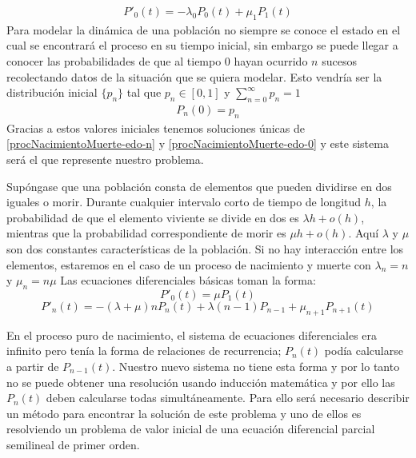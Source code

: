 \begin{eqnarray}
    P'_0(t)=-\lambda_0 P_0(t)+\mu_{1}P_{1}(t)
\label{procNacimientoMuerte-edo-0}
\end{eqnarray}
Para modelar la dinámica de una población no siempre se conoce el estado en el cual se encontrará el proceso en su tiempo inicial, sin embargo se puede llegar a conocer las probabilidades de que al tiempo $0$ hayan ocurrido $n$ sucesos recolectando datos de la situación que se quiera modelar. Esto vendría ser la distribución inicial $\{p_n\}$ tal que $p_n\in [0,1]$ y $\sum_{n=0}^\infty p_n =1$
\begin{eqnarray}
    P_n(0)=p_n
\end{eqnarray}
Gracias a estos valores iniciales tenemos soluciones únicas de \ref{procNacimientoMuerte-edo-n} y \ref{procNacimientoMuerte-edo-0} y este sistema será el que represente nuestro problema.\\
\begin{Ejm}
Supóngase que una población consta de elementos que pueden dividirse en dos iguales o morir. Durante cualquier intervalo corto de tiempo de longitud $h$, la probabilidad de que el elemento viviente se divide en dos es $\lambda h+ o(h)$, mientras que la probabilidad correspondiente de morir es $\mu h + o(h)$. Aquí $\lambda$ y $\mu$ son dos constantes características de la población. Si no hay interacción entre los elementos, estaremos en el caso de un proceso de nacimiento y muerte con $\lambda_n=n$ y $\mu_n =n \mu$
Las ecuaciones diferenciales básicas toman la forma:
$$P'_0(t)=\mu P_1(t)$$
$$P'_n(t)=-(\lambda+\mu)n P_n(t)+\lambda(n-1)P_{n-1}+\mu_{n+1}P_{n+1}(t)$$
\end{Ejm}
En el proceso puro de nacimiento, el sistema de ecuaciones diferenciales era infinito pero tenía la forma de relaciones de recurrencia; $P_n(t)$ podía calcularse a partir de $P_{n-1}(t)$. Nuestro nuevo sistema no tiene esta forma y por lo tanto no se puede obtener una resolución usando inducción matemática y por ello las $P_n(t)$ deben calcularse todas simultáneamente. Para ello será necesario describir un método para encontrar la solución de este problema y uno de ellos es resolviendo un problema de valor inicial de una ecuación diferencial parcial semilineal de primer orden.